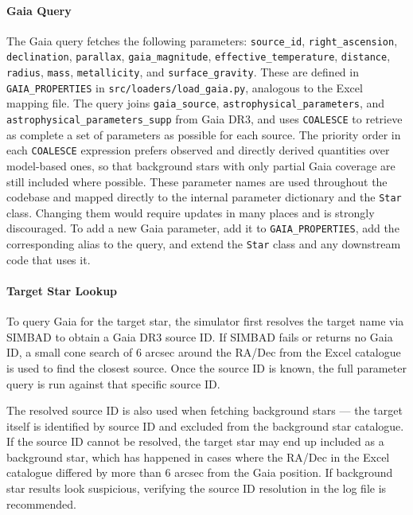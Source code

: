 \paragraph{Gaia Query} The Gaia query fetches the following parameters: \texttt{source\_id}, \texttt{right\_ascension}, \texttt{declination}, \texttt{parallax}, \texttt{gaia\_magnitude}, \texttt{effective\_temperature}, \texttt{distance}, \texttt{radius}, \texttt{mass}, \texttt{metallicity}, and \texttt{surface\allowbreak\_gravity}. These are defined in \texttt{GAIA\_PROPERTIES} in \texttt{src/loaders/load\_gaia.py}, analogous to the Excel mapping file. The query joins \texttt{gaia\_source}, \texttt{astrophysical\_parameters}, and \texttt{astrophysical\_parameters\_supp} from Gaia DR3, and uses \texttt{COALESCE} to retrieve as complete a set of parameters as possible for each source. The priority order in each \texttt{COALESCE} expression prefers observed and directly derived quantities over model-based ones, so that background stars with only partial Gaia coverage are still included where possible. These parameter names are used throughout the codebase and mapped directly to the internal parameter dictionary and the \texttt{Star} class. Changing them would require updates in many places and is strongly discouraged. To add a new Gaia parameter, add it to \texttt{GAIA\_PROPERTIES}, add the corresponding alias to the query, and extend the \texttt{Star} class and any downstream code that uses it.

\paragraph{Target Star Lookup} To query Gaia for the target star, the simulator first resolves the target name via SIMBAD to obtain a Gaia DR3 source ID. If SIMBAD fails or returns no Gaia ID, a small cone search of 6 arcsec around the RA/Dec from the Excel catalogue is used to find the closest source. Once the source ID is known, the full parameter query is run against that specific source ID.

The resolved source ID is also used when fetching background stars — the target itself is identified by source ID and excluded from the background star catalogue. If the source ID cannot be resolved, the target star may end up included as a background star, which has happened in cases where the RA/Dec in the Excel catalogue differed by more than 6 arcsec from the Gaia position. If background star results look suspicious, verifying the source ID resolution in the log file is recommended.

